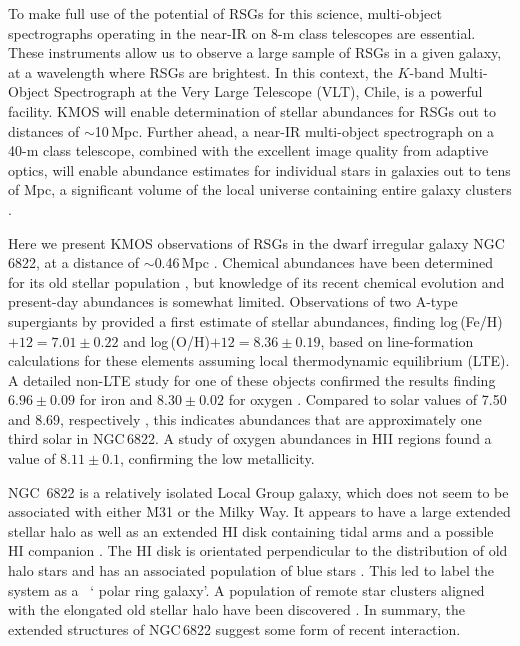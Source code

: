 To make full use of the potential of RSGs for this science, multi-object spectrographs operating in the near-IR on 8-m class telescopes are essential.
These instruments allow us to observe a large sample of RSGs in a given galaxy, at a wavelength where RSGs are brightest.
In this context, the $K$-band Multi-Object Spectrograph
\citep[KMOS;][]{2013Msngr.151...21S} at the Very Large Telescope (VLT), Chile, is a powerful facility.
KMOS will enable determination of stellar abundances for RSGs out to distances of $\sim$10\,Mpc.
Further ahead, a near-IR multi-object spectrograph on a 40-m class telescope, combined with the excellent image quality from adaptive optics,
will enable abundance estimates for individual stars in galaxies out to tens of Mpc,
a significant volume of the local universe containing entire galaxy clusters
\citep{2011A&A...527A..50E}.

Here we present KMOS observations of RSGs in the dwarf irregular galaxy NGC\,6822,
at a distance of $\sim$0.46\,Mpc
\citep[][and references therein]{2012AJ....144....4M}.
Chemical abundances have been determined for its old stellar population
\citep[e.g.][]{2001MNRAS.327..918T,2013ApJ...779..102K},
but knowledge of its recent chemical evolution and present-day abundances is
somewhat limited.
Observations of two A-type supergiants by
\cite{2001ApJ...547..765V} provided a first estimate of stellar abundances, finding
log\,(Fe/H)$+12=7.01\pm0.22$ and
log\,(O/H)$+12=8.36\pm0.19$, based on line-formation calculations for these elements
assuming local thermodynamic equilibrium (LTE).
A detailed non-LTE study for one of these objects confirmed the results finding
$6.96\pm 0.09$ for iron and $8.30\pm0.02$ for oxygen
\citep{Przybilla02}.
Compared to solar values of 7.50 and 8.69, respectively
\citep{2009ARA&A..47..481A},
this indicates abundances that are approximately one third solar in NGC\,6822.
A study of oxygen abundances in HII regions
\citep{2006ApJ...642..813L} found a value of $8.11\pm0.1$, confirming the low metallicity.

NGC\, 6822 is a relatively isolated Local Group galaxy, which does not seem to be associated with either M31 or the Milky Way.
It appears to have a large extended stellar halo
\citep{2002AJ....123..832L,2014ApJ...783...49H}
as well as an extended HI disk containing tidal arms and a possible HI companion
\citep{2000ApJ...537L..95D}.
The HI disk is orientated perpendicular to the distribution of old halo stars and has an associated population of blue stars
\citep{2003MNRAS.341L..39D,2003ApJ...590L..17K}.
This led \cite{2006ApJ...636L..85D} to label the system as a
~\textquoteleft
polar ring galaxy\textquoteright.
A population of remote star clusters aligned with the elongated old stellar halo have been discovered
\citep{2011ApJ...738...58H,2013MNRAS.429.1039H}.
In summary, the extended structures of NGC\,6822 suggest some form of recent interaction.

